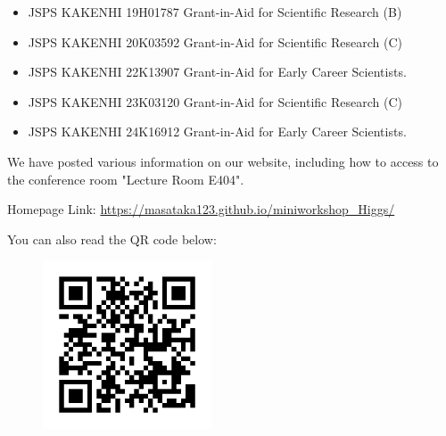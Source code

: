 \documentclass[dvipdfmx,a4paper,12pt]{article}
\theoremstyle{plain} %
\theoremstyle{definition} %
\begin{document}
\vskip3mm
\begin{itemize}
  \setlength{\parskip}{0cm} 
  \setlength{\itemsep}{0cm}
\item JSPS KAKENHI 19H01787 Grant-in-Aid for Scientific Research (B)
\item JSPS KAKENHI 20K03592 Grant-in-Aid for Scientific Research (C)
\item JSPS KAKENHI 22K13907 Grant-in-Aid for Early Career Scientists.
\item JSPS KAKENHI 23K03120 Grant-in-Aid for Scientific Research (C)
\item JSPS KAKENHI 24K16912 Grant-in-Aid for Early Career Scientists.  
\end{itemize}


We have posted various information on our website, including how to access to the conference room "Lecture Room E404".

\vskip3mm
Homepage Link: \url{https://masataka123.github.io/miniworkshop_Higgs/}

You can also read the QR code below:

\begin{figure}[htbp]
\begin{center}
 \includegraphics[height=50mm, width=50mm]{Higgs.png}
\end{center}
\end{figure}



\newpage

\vskip5mm

\vskip3mm


\end{document}
